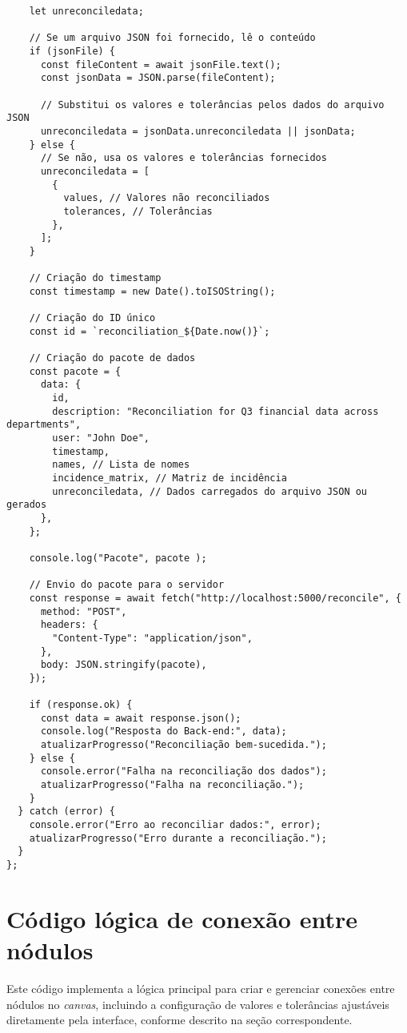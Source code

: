 \begin{verbatim}
    let unreconciledata;

    // Se um arquivo JSON foi fornecido, lê o conteúdo
    if (jsonFile) {
      const fileContent = await jsonFile.text();
      const jsonData = JSON.parse(fileContent);

      // Substitui os valores e tolerâncias pelos dados do arquivo JSON
      unreconciledata = jsonData.unreconciledata || jsonData;
    } else {
      // Se não, usa os valores e tolerâncias fornecidos
      unreconciledata = [
        {
          values, // Valores não reconciliados
          tolerances, // Tolerâncias
        },
      ];
    }

    // Criação do timestamp
    const timestamp = new Date().toISOString();

    // Criação do ID único
    const id = `reconciliation_${Date.now()}`;

    // Criação do pacote de dados
    const pacote = {
      data: {
        id,
        description: "Reconciliation for Q3 financial data across departments",
        user: "John Doe",
        timestamp,
        names, // Lista de nomes
        incidence_matrix, // Matriz de incidência
        unreconciledata, // Dados carregados do arquivo JSON ou gerados
      },
    };

    console.log("Pacote", pacote );

    // Envio do pacote para o servidor
    const response = await fetch("http://localhost:5000/reconcile", {
      method: "POST",
      headers: {
        "Content-Type": "application/json",
      },
      body: JSON.stringify(pacote),
    });

    if (response.ok) {
      const data = await response.json();
      console.log("Resposta do Back-end:", data);
      atualizarProgresso("Reconciliação bem-sucedida.");
    } else {
      console.error("Falha na reconciliação dos dados");
      atualizarProgresso("Falha na reconciliação.");
    }
  } catch (error) {
    console.error("Erro ao reconciliar dados:", error);
    atualizarProgresso("Erro durante a reconciliação.");
  }
};
\end{verbatim}

\chapter{Código lógica de conexão entre nódulos}
\label{Anexo:frontCodeNodeTwoOne}

Este código implementa a lógica principal para criar e gerenciar conexões entre nódulos no \textit{canvas}, incluindo a configuração de valores e tolerâncias ajustáveis diretamente pela interface, conforme descrito na seção correspondente.


